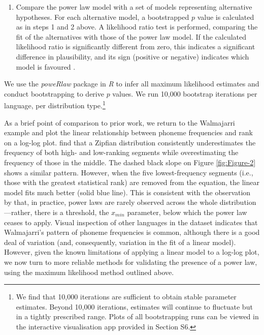 \begin{enumerate}
\item
  Compare the power law model with a set of models representing alternative hypotheses. For each alternative model, a bootstrapped \(p\) value is calculated as in steps 1 and 2 above. A likelihood ratio test is performed, comparing the fit of the alternatives with those of the power law model. If the calculated likelihood ratio is significantly different from zero, this indicates a significant difference in plausibility, and its sign (positive or negative) indicates which model is favoured \autocite[p.~680]{clauset_power-law_2009}.
\end{enumerate}

We use the \emph{poweRlaw} package \autocite{gillespie_fitting_2014} in \emph{R} \autocite{r-core-team_r_2017} to infer all maximum likelihood estimates and conduct bootstrapping to derive \(p\) values. We run 10,000 bootstrap iterations per language, per distribution type.\footnote{We find that 10,000 iterations are sufficient to obtain stable parameter estimates. Beyond 10,000 iterations, estimates will continue to fluctuate but in a tightly prescribed range. Plots of all bootstrapping runs can be viewed in the interactive visualisation app provided in Section S6.}

As a brief point of comparison to prior work, we return to the Walmajarri example and plot the linear relationship between phoneme frequencies and rank on a log-log plot. \textcite{tambovtsev_phoneme_2007} find that a Zipfian distribution consistently underestimates the frequency of both high- and low-ranking segments while overestimating the frequency of those in the middle. The dashed black slope on Figure \ref{fig:Figure-2} shows a similar pattern. However, when the five lowest-frequency segments (i.e., those with the greatest statistical rank) are removed from the equation, the linear model fits much better (solid blue line). This is consistent with the observation by \textcite{clauset_power-law_2009} that, in practice, power laws are rarely observed across the whole distribution---rather, there is a threshold, the \(x_{min}\) parameter, below which the power law ceases to apply. Visual inspection of other languages in the dataset indicates that Walmajarri's pattern of phoneme frequencies is common, although there is a good deal of variation (and, consequently, variation in the fit of a linear model). However, given the known limitations of applying a linear model to a log-log plot, we now turn to more reliable methods for validating the presence of a power law, using the maximum likelihood method outlined above.


